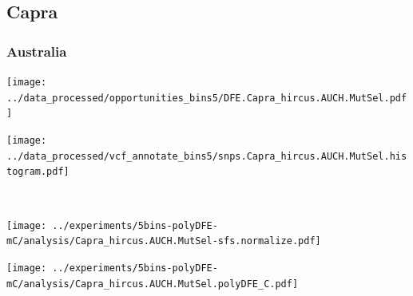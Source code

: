 \subsection{Capra}

\subsubsection{Australia}

\begin{minipage}{0.49\linewidth}
    \texttt{[image: ../data\_processed/opportunities\_bins5/DFE.Capra\_hircus.AUCH.MutSel.pdf]}
\end{minipage}
\begin{minipage}{0.49\linewidth}
    \texttt{[image: ../data\_processed/vcf\_annotate\_bins5/snps.Capra\_hircus.AUCH.MutSel.histogram.pdf]}
\end{minipage}
\\
\begin{minipage}{0.49\linewidth}
    \texttt{[image: ../experiments/5bins-polyDFE-mC/analysis/Capra\_hircus.AUCH.MutSel-sfs.normalize.pdf]}
\end{minipage}
\begin{minipage}{0.4\linewidth}
    \texttt{[image: ../experiments/5bins-polyDFE-mC/analysis/Capra\_hircus.AUCH.MutSel.polyDFE\_C.pdf]}
\end{minipage}
